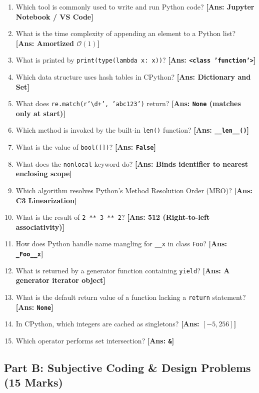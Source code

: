 \begin{enumerate}[label=\textbf{\arabic*.}]
    \item Which tool is commonly used to write and run Python code? \hfill \textbf{[Ans: Jupyter Notebook / VS Code]}
    \item What is the time complexity of appending an element to a Python list? \hfill \textbf{[Ans: Amortized $\mathcal{O}(1)$]}
    \item What is printed by \texttt{print(type(lambda x: x))}? \hfill \textbf{[Ans: \texttt{<class 'function'>}]}
    \item Which data structure uses hash tables in CPython? \hfill \textbf{[Ans: Dictionary and Set]}
    \item What does \texttt{re.match(r'\textbackslash d+', 'abc123')} return? \hfill \textbf{[Ans: \texttt{None} (matches only at start)]}
    \item Which method is invoked by the built-in \texttt{len()} function? \hfill \textbf{[Ans: \texttt{\_\_len\_\_()}]}
    \item What is the value of \texttt{bool([])}? \hfill \textbf{[Ans: \texttt{False}]}
    \item What does the \texttt{nonlocal} keyword do? \hfill \textbf{[Ans: Binds identifier to nearest enclosing scope]}
    \item Which algorithm resolves Python's Method Resolution Order (MRO)? \hfill \textbf{[Ans: C3 Linearization]}
    \item What is the result of \texttt{2 ** 3 ** 2}? \hfill \textbf{[Ans: 512 (Right-to-left associativity)]}
    \item How does Python handle name mangling for \texttt{\_\_x} in class \texttt{Foo}? \hfill \textbf{[Ans: \texttt{\_Foo\_\_x}]}
    \item What is returned by a generator function containing \texttt{yield}? \hfill \textbf{[Ans: A generator iterator object]}
    \item What is the default return value of a function lacking a \texttt{return} statement? \hfill \textbf{[Ans: \texttt{None}]}
    \item In CPython, which integers are cached as singletons? \hfill \textbf{[Ans: $[-5, 256]$]}
    \item Which operator performs set intersection? \hfill \textbf{[Ans: \texttt{\&}]}
\end{enumerate}

\subsection*{Part B: Subjective Coding \& Design Problems (15 Marks)}

